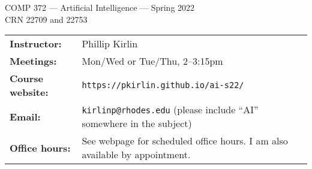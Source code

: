 \documentclass [letterpaper,11pt]{article}
\begin{document}
\begin{center}
\Large COMP 372 --- Artificial Intelligence --- Spring 2022
\\ \normalsize CRN 22709 and 22753
\end{center}

\noindent\begin{tabular}{@{}ll}
\textbf{Instructor:} & Phillip Kirlin \\
\textbf{Meetings:} & Mon/Wed or Tue/Thu, 2--3:15pm \\
\textbf{Course website:} & \texttt{https://pkirlin.github.io/ai-s22/} \\
\textbf{Email:} & \texttt{kirlinp@rhodes.edu} (please include ``AI'' somewhere in the subject)\\
\textbf{Office hours:} & See webpage for scheduled office hours.  I am also available by appointment.\\
\end{tabular}
\end{document}
